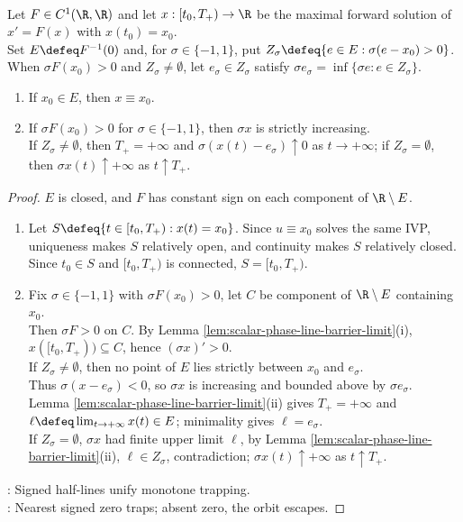 \begin{theorem} \label{thm:autonomous-scalar-phase-line-classification} \\
Let $F\in C^1(\R,\R)$ and let $x:[t_0,T_+)\to\R$ be the maximal forward solution of $x'=F(x)$ with $x(t_0)=x_0$.\\
Set $E\defeq F^{-1}(0)$ and, for $\sigma\in\{-1,1\}$, put $Z_\sigma\defeq\{e\in E:\sigma(e-x_0)>0\}$.\\
When $\sigma F(x_0)>0$ and $Z_\sigma\neq\emptyset$, let $e_\sigma\in Z_\sigma$ satisfy $\sigma e_\sigma=\inf\{\sigma e:e\in Z_\sigma\}$.
\begin{enumerate}[label=(\roman*)]
\setlength{\itemsep}{0pt}
\item If $x_0\in E$, then $x\equiv x_0$.
\item If $\sigma F(x_0)>0$ for $\sigma\in\{-1,1\}$, then $\sigma x$ is strictly increasing.\\
If $Z_\sigma\neq\emptyset$, then $T_+=+\infty$ and $\sigma(x(t)-e_\sigma)\uparrow0$ as $t\to+\infty$; if $Z_\sigma=\emptyset$, then $\sigma x(t)\uparrow+\infty$ as $t\uparrow T_+$.
\end{enumerate}
\begin{proof}
$E$ is closed, and $F$ has constant sign on each component of $\R\setminus E$.
\begin{enumerate}[label=(\roman*)]
\setlength{\itemsep}{0pt}
\item Let $S\defeq\{t\in[t_0,T_+):x(t)=x_0\}$. Since $u\equiv x_0$ solves the same IVP, uniqueness makes $S$ relatively open, and continuity makes $S$ relatively closed. Since $t_0\in S$ and $[t_0,T_+)$ is connected, $S=[t_0,T_+)$.
\item Fix $\sigma\in\{-1,1\}$ with $\sigma F(x_0)>0$, let $C$ be component of $\R\setminus E$ containing $x_0$.\\
Then $\sigma F>0$ on $C$. By Lemma \ref{lem:scalar-phase-line-barrier-limit}(i), $x([t_0,T_+))\subseteq C$, hence $(\sigma x)'>0$.\\
If $Z_\sigma\neq\emptyset$, then no point of $E$ lies strictly between $x_0$ and $e_\sigma$.\\
Thus $\sigma(x-e_\sigma)<0$, so $\sigma x$ is increasing and bounded above by $\sigma e_\sigma$.\\
Lemma \ref{lem:scalar-phase-line-barrier-limit}(ii) gives $T_+=+\infty$ and $\ell\defeq\lim_{t\to+\infty}x(t)\in E$; minimality gives $\ell=e_\sigma$.\\
If $Z_\sigma=\emptyset$, $\sigma x$ had finite upper limit $\ell$, by Lemma \ref{lem:scalar-phase-line-barrier-limit}(ii), $\ell\in Z_\sigma$, contradiction; $\sigma x(t)\uparrow+\infty$ as $t\uparrow T_+$.
\end{enumerate}
: Signed half-lines unify monotone trapping.\\
: Nearest signed zero traps; absent zero, the orbit escapes.
\end{proof}
\end{theorem}

